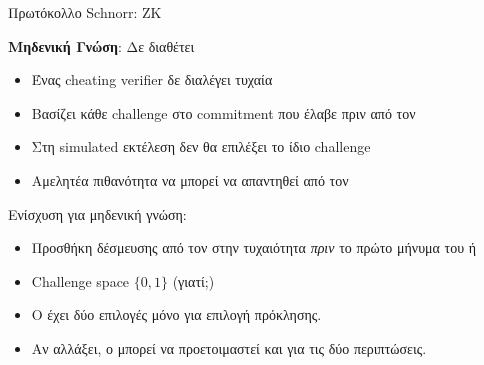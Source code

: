 \documentclass[handout]{beamer}
\begin{document}
\begin{frame}{Πρωτόκολλο Schnorr: ZK}

\textbf{Μηδενική Γνώση}: \alert{Δε διαθέτει}
\pause
\begin{itemize}
\item Ένας cheating verifier δε διαλέγει τυχαία \pause
\item Bασίζει κάθε challenge στο commitment που έλαβε πριν από τον \siml \pause
\item Στη simulated εκτέλεση δεν θα επιλέξει το ίδιο challenge \pause
\item Αμελητέα πιθανότητα να μπορεί να απαντηθεί από τον \siml \pause
\end{itemize}

Ενίσχυση για μηδενική γνώση: \pause

\begin{itemize}
\item Προσθήκη δέσμευσης από τον \ver στην τυχαιότητα \emph{πριν} το πρώτο μήνυμα του \prv ή \pause
\item Challenge space $\{ 0 , 1 \} $ (γιατί;) \pause
\item Ο \ver έχει δύο επιλογές μόνο για επιλογή πρόκλησης. 
\item Αν αλλάξει, ο \siml μπορεί να προετοιμαστεί και για τις δύο περιπτώσεις.
\end{itemize} 

\end{frame}
\end{document}
